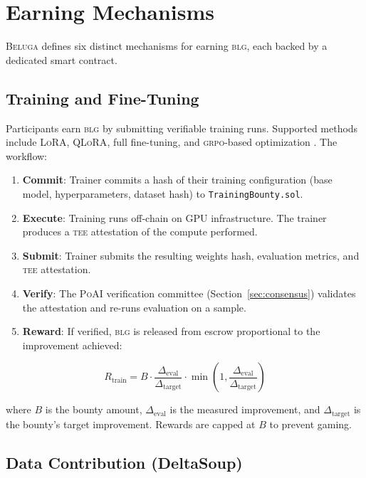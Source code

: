 \documentclass[11pt,letterpaper]{article}
\newcommand{\Beluga}{\textsc{Beluga}}
\newcommand{\BLG}{\textsc{blg}}
\newcommand{\PoAI}{\textsc{PoAI}}
\newcommand{\TEE}{\textsc{tee}}
\newcommand{\LoRA}{\textsc{LoRA}}
\newcommand{\QLoRA}{\textsc{QLoRA}}
\newcommand{\GRPO}{\textsc{grpo}}
\begin{document}
\section{Earning Mechanisms}\label{sec:earning}

\Beluga{} defines six distinct mechanisms for earning \BLG{}, each backed by a dedicated smart contract.

\subsection{Training and Fine-Tuning}

Participants earn \BLG{} by submitting verifiable training runs. Supported methods include \LoRA{}, \QLoRA{}, full fine-tuning, and \GRPO{}-based optimization \cite{zoo-gym}. The workflow:

\begin{enumerate}
    \item \textbf{Commit}: Trainer commits a hash of their training configuration (base model, hyperparameters, dataset hash) to \texttt{TrainingBounty.sol}.
    \item \textbf{Execute}: Training runs off-chain on GPU infrastructure. The trainer produces a \TEE{} attestation \cite{zoo-poai} of the compute performed.
    \item \textbf{Submit}: Trainer submits the resulting weights hash, evaluation metrics, and \TEE{} attestation.
    \item \textbf{Verify}: The \PoAI{} verification committee (Section~\ref{sec:consensus}) validates the attestation and re-runs evaluation on a sample.
    \item \textbf{Reward}: If verified, \BLG{} is released from escrow proportional to the improvement achieved:
\end{enumerate}

\begin{equation}
R_{\text{train}} = B \cdot \frac{\Delta_{\text{eval}}}{\Delta_{\text{target}}} \cdot \min\left(1, \frac{\Delta_{\text{eval}}}{\Delta_{\text{target}}}\right)
\end{equation}

where $B$ is the bounty amount, $\Delta_{\text{eval}}$ is the measured improvement, and $\Delta_{\text{target}}$ is the bounty's target improvement. Rewards are capped at $B$ to prevent gaming.

\subsection{Data Contribution (DeltaSoup)}
\end{document}
